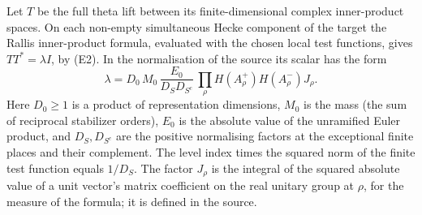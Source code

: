 \documentclass[11pt,letterpaper]{article}
\begin{document}
Let $T$ be the full theta lift between its finite-dimensional complex
inner-product spaces. On each non-empty simultaneous Hecke component of the target
the Rallis inner-product formula, evaluated with the chosen local test
functions, gives $TT^*=\lambda I$, by (E2). In the normalisation of the source
its scalar has the form
\begin{equation}\label{D:172}
 \lambda= D_0\,M_0\,
       \frac{E_0}{D_S D_{S^c}}\,
       \prod_\rho H(A_\rho^+)H(A_\rho^-)J_\rho .
\end{equation}
Here $D_0\ge1$ is a product of representation dimensions, $M_0$ is
the mass (the sum of reciprocal stabilizer orders), $E_0$ is the
absolute value of the unramified Euler product, and $D_S,D_{S^c}$
are the positive normalising factors at the exceptional finite places
and their complement. The level index times the squared norm of the
finite test function equals $1/D_S$. The factor $J_\rho$ is the integral
of the squared absolute value of a unit vector's matrix coefficient
on the real unitary group at $\rho$, for the measure of the formula; it is defined in the source.
\end{document}
